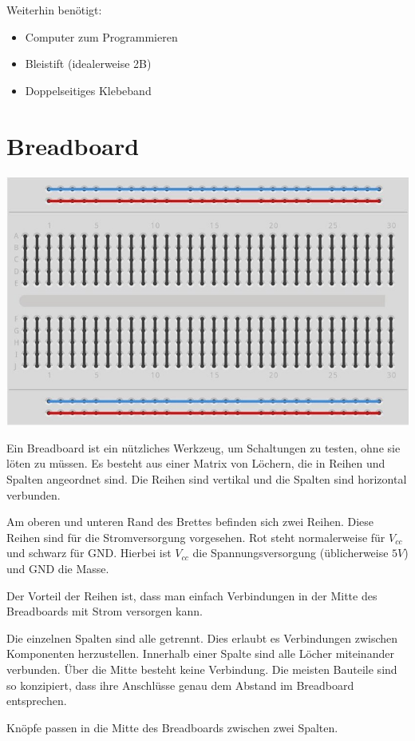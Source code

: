 \documentclass[a4paper,12pt]{book}
\begin{document}
Weiterhin benötigt:
\begin{itemize}
  \item Computer zum Programmieren
  \item Bleistift (idealerweise 2B)
  \item Doppelseitiges Klebeband
\end{itemize}

\section*{Breadboard}

\begin{center}
\includegraphics[width=.8\textwidth]{images/breadboard.jpg}
\end{center}

Ein Breadboard ist ein nützliches Werkzeug, um Schaltungen zu testen, ohne sie löten zu müssen.  
Es besteht aus einer Matrix von Löchern, die in Reihen und Spalten angeordnet sind.  
Die Reihen sind vertikal und die Spalten sind horizontal verbunden.

Am oberen und unteren Rand des Brettes befinden sich zwei Reihen.
Diese Reihen sind für die Stromversorgung vorgesehen.
Rot steht normalerweise für $V_{cc}$ und schwarz für GND.
Hierbei ist $V_{cc}$ die Spannungsversorgung (üblicherweise $5V$) und GND die Masse.

Der Vorteil der Reihen ist, dass man einfach Verbindungen in der Mitte des Breadboards mit Strom versorgen kann.

Die einzelnen Spalten sind alle getrennt.
Dies erlaubt es Verbindungen zwischen Komponenten herzustellen.
Innerhalb einer Spalte sind alle Löcher miteinander verbunden.
Über die Mitte besteht keine Verbindung.
Die meisten Bauteile sind so konzipiert, dass ihre Anschlüsse genau dem Abstand im Breadboard entsprechen.

Knöpfe passen in die Mitte des Breadboards zwischen zwei Spalten.
\end{document}
